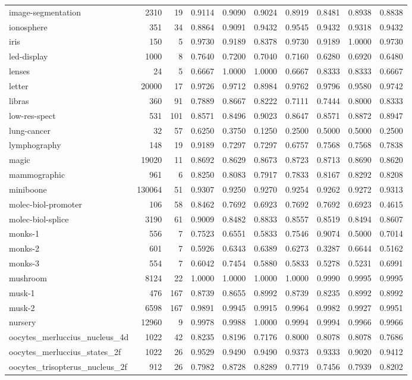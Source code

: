 \documentclass{article}
\begin{document}
\begin{table}
\footnotesize
\begin{tabular}{lrrlllllll}
image-segmentation & 2310 & 19 & 0.9114 & 0.9090 & 0.9024 & 0.8919 & 0.8481 & 0.8938 & 0.8838\tabularnewline
ionosphere & 351 & 34 & 0.8864 & 0.9091 & 0.9432 & 0.9545 & 0.9432 & 0.9318 & 0.9432\tabularnewline
iris & 150 & 5 & 0.9730 & 0.9189 & 0.8378 & 0.9730 & 0.9189 & 1.0000 & 0.9730\tabularnewline
led-display & 1000 & 8 & 0.7640 & 0.7200 & 0.7040 & 0.7160 & 0.6280 & 0.6920 & 0.6480\tabularnewline
lenses & 24 & 5 & 0.6667 & 1.0000 & 1.0000 & 0.6667 & 0.8333 & 0.8333 & 0.6667\tabularnewline
letter & 20000 & 17 & 0.9726 & 0.9712 & 0.8984 & 0.9762 & 0.9796 & 0.9580 & 0.9742\tabularnewline
libras & 360 & 91 & 0.7889 & 0.8667 & 0.8222 & 0.7111 & 0.7444 & 0.8000 & 0.8333\tabularnewline
low-res-spect & 531 & 101 & 0.8571 & 0.8496 & 0.9023 & 0.8647 & 0.8571 & 0.8872 & 0.8947\tabularnewline
lung-cancer & 32 & 57 & 0.6250 & 0.3750 & 0.1250 & 0.2500 & 0.5000 & 0.5000 & 0.2500\tabularnewline
lymphography & 148 & 19 & 0.9189 & 0.7297 & 0.7297 & 0.6757 & 0.7568 & 0.7568 & 0.7838\tabularnewline
magic & 19020 & 11 & 0.8692 & 0.8629 & 0.8673 & 0.8723 & 0.8713 & 0.8690 & 0.8620\tabularnewline
mammographic & 961 & 6 & 0.8250 & 0.8083 & 0.7917 & 0.7833 & 0.8167 & 0.8292 & 0.8208\tabularnewline
miniboone & 130064 & 51 & 0.9307 & 0.9250 & 0.9270 & 0.9254 & 0.9262 & 0.9272 & 0.9313\tabularnewline
molec-biol-promoter & 106 & 58 & 0.8462 & 0.7692 & 0.6923 & 0.7692 & 0.7692 & 0.6923 & 0.4615\tabularnewline
molec-biol-splice & 3190 & 61 & 0.9009 & 0.8482 & 0.8833 & 0.8557 & 0.8519 & 0.8494 & 0.8607\tabularnewline
monks-1 & 556 & 7 & 0.7523 & 0.6551 & 0.5833 & 0.7546 & 0.9074 & 0.5000 & 0.7014\tabularnewline
monks-2 & 601 & 7 & 0.5926 & 0.6343 & 0.6389 & 0.6273 & 0.3287 & 0.6644 & 0.5162\tabularnewline
monks-3 & 554 & 7 & 0.6042 & 0.7454 & 0.5880 & 0.5833 & 0.5278 & 0.5231 & 0.6991\tabularnewline
mushroom & 8124 & 22 & 1.0000 & 1.0000 & 1.0000 & 1.0000 & 0.9990 & 0.9995 & 0.9995\tabularnewline
musk-1 & 476 & 167 & 0.8739 & 0.8655 & 0.8992 & 0.8739 & 0.8235 & 0.8992 & 0.8992\tabularnewline
musk-2 & 6598 & 167 & 0.9891 & 0.9945 & 0.9915 & 0.9964 & 0.9982 & 0.9927 & 0.9951\tabularnewline
nursery & 12960 & 9 & 0.9978 & 0.9988 & 1.0000 & 0.9994 & 0.9994 & 0.9966 & 0.9966\tabularnewline
oocytes\_merluccius\_nucleus\_4d & 1022 & 42 & 0.8235 & 0.8196 & 0.7176 & 0.8000 & 0.8078 & 0.8078 & 0.7686\tabularnewline
oocytes\_merluccius\_states\_2f & 1022 & 26 & 0.9529 & 0.9490 & 0.9490 & 0.9373 & 0.9333 & 0.9020 & 0.9412\tabularnewline
oocytes\_trisopterus\_nucleus\_2f & 912 & 26 & 0.7982 & 0.8728 & 0.8289 & 0.7719 & 0.7456 & 0.7939 & 0.8202\tabularnewline

\end{tabular}
\end{table}
\end{document}
